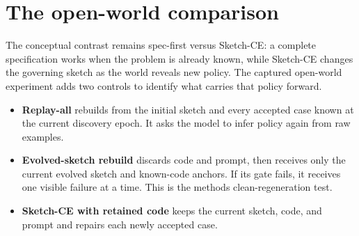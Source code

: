 \section{The open-world comparison}\label{the-open-world-comparison}

The conceptual contrast remains spec-first versus Sketch-CE: a complete specification works when
the problem is already known, while Sketch-CE changes the governing sketch as the world reveals
new policy. The captured open-world experiment adds two controls to identify what carries that
policy forward.

\begin{itemize}
\tightlist
\item
  \textbf{Replay-all} rebuilds from the initial sketch and every accepted case known at the current
  discovery epoch. It asks the model to infer policy again from raw examples.
\item
  \textbf{Evolved-sketch rebuild} discards code and prompt, then receives only the current evolved
  sketch and known-code anchors. If its gate fails, it receives one visible failure at a time.
  This is the method\textquotesingle s clean-regeneration test.
\item
  \textbf{Sketch-CE with retained code} keeps the current sketch, code, and prompt and repairs each
  newly accepted case.
\end{itemize}

